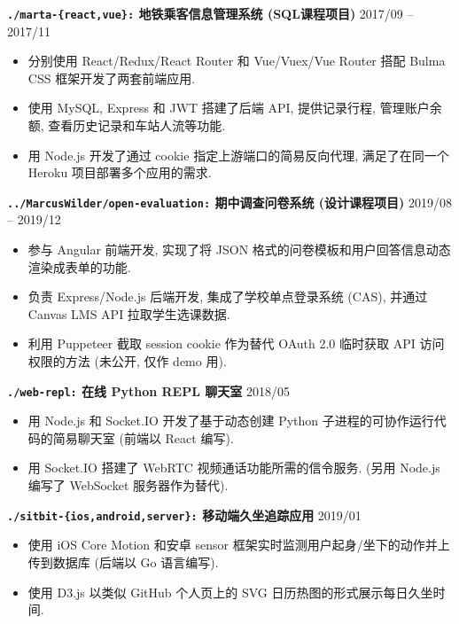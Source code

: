 \documentclass[10 pt]{article}
\begin{document}
\textbf{\texttt{./marta-\{react,vue\}:} 地铁乘客信息管理系统 (SQL课程项目) } \hfill 2017/09 -- 2017/11
\begin{itemize}
\item 分别使用 React/Redux/React Router 和 Vue/Vuex/Vue Router 搭配 Bulma  CSS 框架开发了两套前端应用.
\item 使用 MySQL, Express 和 JWT 搭建了后端 API, 提供记录行程, 管理账户余额, 查看历史记录和车站人流等功能.
\item 用 Node.js 开发了通过 cookie 指定上游端口的简易反向代理, 满足了在同一个 Heroku 项目部署多个应用的需求.
\end{itemize}

\textbf{\texttt{../MarcusWilder/open-evaluation:} 期中调查问卷系统 (设计课程项目)} \hfill 2019/08 -- 2019/12
\begin{itemize}
\item 参与 Angular 前端开发, 实现了将 JSON 格式的问卷模板和用户回答信息动态渲染成表单的功能.
\item 负责 Express/Node.js 后端开发, 集成了学校单点登录系统 (CAS), 并通过 Canvas LMS API 拉取学生选课数据.
\item 利用 Puppeteer 截取 session cookie 作为替代 OAuth 2.0 临时获取 API 访问权限的方法 (未公开, 仅作 demo 用).
\end{itemize}

\textbf{\texttt{./web-repl:} 在线 Python REPL 聊天室}  \hfill 2018/05 
\begin{itemize}
\item 用 Node.js 和 Socket.IO 开发了基于动态创建 Python 子进程的可协作运行代码的简易聊天室 (前端以 React 编写).
\item 用 Socket.IO 搭建了 WebRTC 视频通话功能所需的信令服务. (另用 Node.js 编写了 WebSocket 服务器作为替代).
\end{itemize}

\textbf{\texttt{./sitbit-\{ios,android,server\}:} 移动端久坐追踪应用} \hfill 2019/01
\begin{itemize}
\item 使用 iOS Core Motion 和安卓 sensor 框架实时监测用户起身/坐下的动作并上传到数据库 (后端以 Go 语言编写).
\item 使用 D3.js 以类似 GitHub 个人页上的 SVG 日历热图的形式展示每日久坐时间.
\end{itemize}
\end{document}
